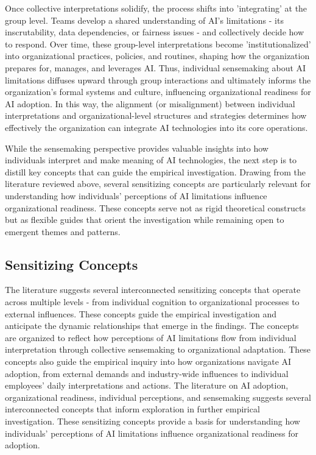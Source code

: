 Once collective interpretations solidify, the process shifts into 'integrating' at the group level. Teams develop a shared understanding of AI's limitations - its inscrutability, data dependencies, or fairness issues - and collectively decide how to respond. Over time, these group-level interpretations become 'institutionalized' into organizational practices, policies, and routines, shaping how the organization prepares for, manages, and leverages AI. Thus, individual sensemaking about AI limitations diffuses upward through group interactions and ultimately informs the organization's formal systems and culture, influencing organizational readiness for AI adoption. In this way, the alignment (or misalignment) between individual interpretations and organizational-level structures and strategies determines how effectively the organization can integrate AI technologies into its core operations.

While the sensemaking perspective provides valuable insights into how individuals interpret and make meaning of AI technologies, the next step is to distill key concepts that can guide the empirical investigation. Drawing from the literature reviewed above, several sensitizing concepts are particularly relevant for understanding how individuals' perceptions of AI limitations influence organizational readiness. These concepts serve not as rigid theoretical constructs but as flexible guides that orient the investigation while remaining open to emergent themes and patterns.

\subsection{Sensitizing Concepts}

The literature suggests several interconnected sensitizing concepts that operate across multiple levels - from individual cognition to organizational processes to external influences. These concepts guide the empirical investigation and anticipate the dynamic relationships that emerge in the findings. The concepts are organized to reflect how perceptions of AI limitations flow from individual interpretation through collective sensemaking to organizational adaptation. These concepts also guide the empirical inquiry into how organizations navigate AI adoption, from external demands and industry-wide influences to individual employees' daily interpretations and actions. The literature on AI adoption, organizational readiness, individual perceptions, and sensemaking suggests several interconnected concepts that inform exploration in further empirical investigation. These sensitizing concepts provide a basis for understanding how individuals' perceptions of AI limitations influence organizational readiness for adoption.

